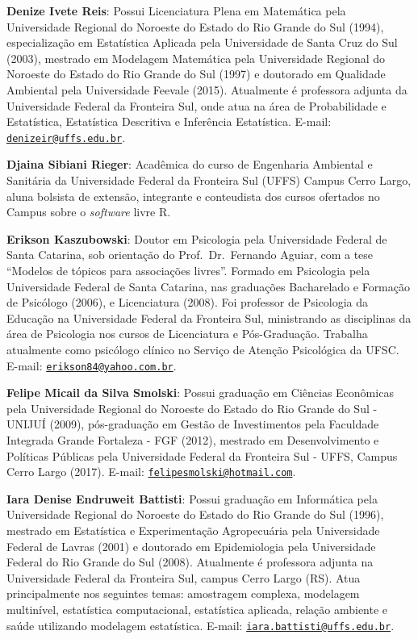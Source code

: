\documentclass[12pt,brazil,oneside]{book}
\begin{document}
\textbf{Denize Ivete Reis}: Possui Licenciatura Plena em Matemática pela Universidade Regional do Noroeste do Estado do Rio Grande do Sul (1994), especialização em Estatística Aplicada pela Universidade de Santa Cruz do Sul (2003), mestrado em Modelagem Matemática pela Universidade Regional do Noroeste do Estado do Rio Grande do Sul (1997) e doutorado em Qualidade Ambiental pela Universidade Feevale (2015). Atualmente é professora adjunta da Universidade Federal da Fronteira Sul, onde atua na área de Probabilidade e Estatística, Estatística Descritiva e Inferência Estatística. E-mail: \href{mailto:denizeir@uffs.edu.br}{\nolinkurl{denizeir@uffs.edu.br}}.

\textbf{Djaina Sibiani Rieger}: Acadêmica do curso de Engenharia Ambiental e Sanitária da Universidade Federal da Fronteira Sul (UFFS) Campus Cerro Largo, aluna bolsista de extensão, integrante e conteudista dos cursos ofertados no Campus sobre o \emph{software} livre R.

\textbf{Erikson Kaszubowski}: Doutor em Psicologia pela Universidade Federal de Santa Catarina, sob orientação do Prof.~Dr.~Fernando Aguiar, com a tese ``Modelos de tópicos para associações livres''. Formado em Psicologia pela Universidade Federal de Santa Catarina, nas graduações Bacharelado e Formação de Psicólogo (2006), e Licenciatura (2008). Foi professor de Psicologia da Educação na Universidade Federal da Fronteira Sul, ministrando as disciplinas da área de Psicologia nos cursos de Licenciatura e Pós-Graduação. Trabalha atualmente como psicólogo clínico no Serviço de Atenção Psicológica da UFSC. E-mail: \href{mailto:erikson84@yahoo.com.br}{\nolinkurl{erikson84@yahoo.com.br}}.

\textbf{Felipe Micail da Silva Smolski}: Possui graduação em Ciências Econômicas pela Universidade Regional do Noroeste do Estado do Rio Grande do Sul - UNIJUÍ (2009), pós-graduação em Gestão de Investimentos pela Faculdade Integrada Grande Fortaleza - FGF (2012), mestrado em Desenvolvimento e Políticas Públicas pela Universidade Federal da Fronteira Sul - UFFS, Campus Cerro Largo (2017). E-mail: \href{mailto:felipesmolski@hotmail.com}{\nolinkurl{felipesmolski@hotmail.com}}.

\textbf{Iara Denise Endruweit Battisti}: Possui graduação em Informática pela Universidade Regional do Noroeste do Estado do Rio Grande do Sul (1996), mestrado em Estatística e Experimentação Agropecuária pela Universidade Federal de Lavras (2001) e doutorado em Epidemiologia pela Universidade Federal do Rio Grande do Sul (2008). Atualmente é professora adjunta na Universidade Federal da Fronteira Sul, campus Cerro Largo (RS). Atua principalmente nos seguintes temas: amostragem complexa, modelagem multinível, estatística computacional, estatística aplicada, relação ambiente e saúde utilizando modelagem estatística. E-mail: \href{mailto:iara.battisti@uffs.edu.br}{\nolinkurl{iara.battisti@uffs.edu.br}}.
\end{document}
